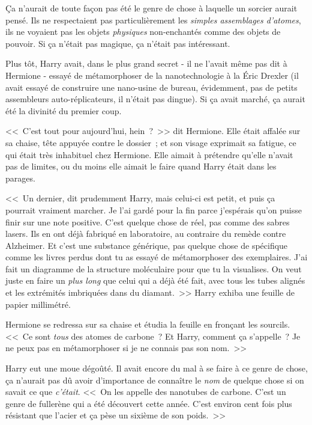 Ça n'aurait de toute façon pas été le genre de chose à laquelle un sorcier aurait pensé. Ils ne respectaient pas particulièrement les \emph{simples assemblages d'atomes}, ils ne voyaient pas les objets \emph{physiques} non-enchantés comme des objets de pouvoir. Si ça n'était pas magique, ça n'était pas intéressant.

Plus tôt, Harry avait, dans le plus grand secret - il ne l'avait même pas dit à Hermione - essayé de métamorphoser de la nanotechnologie à la Éric Drexler (il avait essayé de construire une nano-usine de bureau, évidemment, pas de petits assembleurs auto-réplicateurs, il n'était pas dingue). Si ça avait marché, ça aurait été la divinité du premier coup.

<<~C'est tout pour aujourd'hui, hein~?~>> dit Hermione. Elle était affalée sur sa chaise, tête appuyée contre le dossier~; et son visage exprimait sa fatigue, ce qui était très inhabituel chez Hermione. Elle aimait à prétendre qu'elle n'avait pas de limites, ou du moins elle aimait le faire quand Harry était dans les parages.

<<~Un dernier, dit prudemment Harry, mais celui-ci est petit, et puis ça pourrait vraiment marcher. Je l'ai gardé pour la fin parce j'espérais qu'on puisse finir sur une note positive. C'est quelque chose de réel, pas comme des sabres lasers. Ils en ont déjà fabriqué en laboratoire, au contraire du remède contre Alzheimer. Et c'est une substance générique, pas quelque chose de spécifique comme les livres perdus dont tu as essayé de métamorphoser des exemplaires. J'ai fait un diagramme de la structure moléculaire pour que tu la visualises. On veut juste en faire un \emph{plus long} que celui qui a déjà été fait, avec tous les tubes alignés et les extrémités imbriquées dans du diamant.~>> Harry exhiba une feuille de papier millimétré.

Hermione se redressa sur sa chaise et étudia la feuille en fronçant les sourcils. <<~Ce sont \emph{tous} des atomes de carbone~? Et Harry, comment ça s'appelle~? Je ne peux pas en métamorphoser si je ne connais pas son nom.~>>

Harry eut une moue dégoûté. Il avait encore du mal à se faire à ce genre de chose, ça n'aurait pas dû avoir d'importance de connaître le \emph{nom} de quelque chose si on savait ce que \emph{c'était}. <<~On les appelle des nanotubes de carbone. C'est un genre de fullerène qui a été découvert cette année. C'est environ cent fois plus résistant que l'acier et ça pèse un sixième de son poids.~>>

